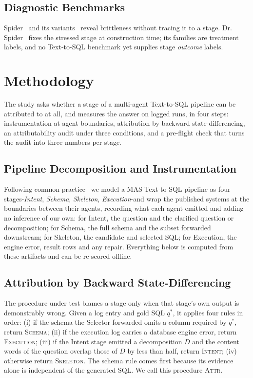 \documentclass{llncs}
\begin{document}
\subsection{Diagnostic Benchmarks}
Spider~\cite{yu_spider_2018} and its variants~\cite{lei_spider2_2025,gan_spider_syn_2021} reveal brittleness without tracing it to a stage.
Dr.\,Spider~\cite{chang_drspider_2023} fixes the stressed stage at construction time; its families are treatment labels, and no Text-to-SQL benchmark yet supplies stage \emph{outcome} labels.

\section{Methodology}
\label{sec:method}

The study asks whether a stage of a multi-agent Text-to-SQL pipeline can be
attributed to at all, and measures the answer on logged runs, in four steps:
instrumentation at agent boundaries, attribution by backward
state-differencing, an attributability audit under three conditions, and a
pre-flight check that turns the audit into three numbers per stage.

\subsection{Pipeline Decomposition and Instrumentation}

Following common practice~\cite{shen_icl_errors_2026} we model a MAS
Text-to-SQL pipeline as four stages-\emph{Intent}, \emph{Schema},
\emph{Skeleton}, \emph{Execution}-and wrap the published systems at the
boundaries between their agents, recording what each agent emitted and adding
no inference of our own: for Intent, the question and the clarified question
or decomposition; for Schema, the full schema and the subset forwarded
downstream; for Skeleton, the candidate and selected SQL; for Execution, the
engine error, result rows and any repair. Everything below is computed from
these artifacts and can be re-scored offline.

\subsection{Attribution by Backward State-Differencing}
\label{sec:attr}

The procedure under test blames a stage only when that stage's own output is
demonstrably wrong. Given a log entry and gold SQL $q^\ast$, it applies four rules in order: (i) if the schema
the Selector forwarded omits a column required by $q^\ast$, return
\textsc{Schema}; (ii) if the execution log carries a database engine error, return
\textsc{Execution}; (iii) if the Intent stage emitted a decomposition $D$ and
the content words of the question overlap those of $D$ by less than half,
return \textsc{Intent};
(iv) otherwise return \textsc{Skeleton}. The schema rule comes first because
its evidence alone is independent of the generated SQL. We call this
procedure \textsc{Attr}.
\end{document}
